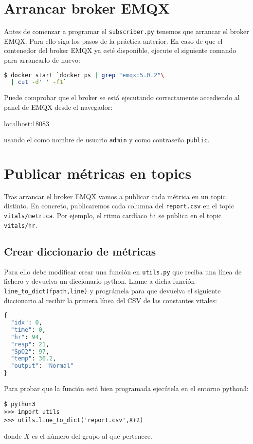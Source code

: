 \documentclass{upmassignment}
\begin{document}
\section*{Arrancar broker EMQX}
\noindent
Antes de comenzar a programar el
\texttt{subscriber.py} tenemos que
arrancar el broker EMQX. Para ello siga
los pasos de la práctica anterior.
En caso de que el contenedor del broker
EMQX ya esté disponible, ejecute el
siguiente comando para arrancarlo de nuevo:
\begin{lstlisting}[language=bash]
$ docker start `docker ps | grep "emqx:5.0.2"\
  | cut -d' ' -f1`
\end{lstlisting}
Puede comprobar que el broker se está
ejecutando correctamente accediendo al
panel de EMQX desde el navegador:
\begin{center}
    \url{localhost:18083}
\end{center}
usando el como nombre de usuario
\texttt{admin} y como contraseña
\texttt{public}.



\section*{Publicar métricas en topics}
Tras arrancar el broker EMQX vamos a
publicar cada métrica en un topic distinto.
En concreto, publicaremos cada columna
del \texttt{report.csv} en el topic
\texttt{vitals/metrica}. Por ejemplo,
el ritmo cardíaco \texttt{hr} se publica
en el topic \texttt{vitals/hr}.

\subsection*{Crear diccionario de métricas}
Para ello debe modificar crear una
función en \texttt{utils.py} que reciba
una línea de fichero y devuelva un diccionario
python. Llame a dicha función
\texttt{line\_to\_dict(fpath,line)} y prográmela
para que devuelva el siguiente diccionario
al recibir la primera línea del CSV
de las constantes vitales:
\begin{lstlisting}[language=python]
{
  "idx": 0,
  "time": 0,
  "hr": 94,
  "resp": 21,
  "SpO2": 97,
  "temp": 36.2,
  "output": "Normal"
}
\end{lstlisting}

Para probar que la función está bien
programada ejecútela en el entorno python3:
\begin{lstlisting}
$ python3
>>> import utils
>>> utils.line_to_dict('report.csv',X+2)
\end{lstlisting}
donde $X$ es el número del grupo al que
pertenece.
\end{document}
